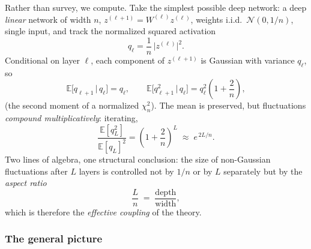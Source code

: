 \documentclass[11pt]{article}
\newcommand{\E}{\mathbb{E}}
\begin{document}
Rather than survey, we compute. Take the simplest possible deep network: a
deep \emph{linear} network of width $n$, $z^{(\ell+1)} = W^{(\ell)}
z^{(\ell)}$, weights i.i.d.\ $\mathcal{N}(0, 1/n)$, single input, and track
the normalized squared activation
\begin{equation}
  q_\ell = \frac{1}{n}\,\bigl|z^{(\ell)}\bigr|^2 .
\end{equation}
Conditional on layer $\ell$, each component of $z^{(\ell+1)}$ is Gaussian
with variance $q_\ell$, so
\begin{equation}
  \E\bigl[q_{\ell+1} \,\big|\, q_\ell\bigr] = q_\ell,
  \qquad
  \E\bigl[q_{\ell+1}^2 \,\big|\, q_\ell\bigr]
  = q_\ell^2\left(1 + \frac{2}{n}\right),
\end{equation}
(the second moment of a normalized $\chi^2_n$). The mean is preserved, but
fluctuations \emph{compound multiplicatively}: iterating,
\begin{equation}
  \label{eq:qfluct}
  \frac{\E[q_L^2]}{\E[q_L]^2} = \left(1 + \frac{2}{n}\right)^{L}
  \;\approx\; e^{\,2L/n}.
\end{equation}
Two lines of algebra, one structural conclusion: the size of
non-Gaussian fluctuations after $L$ layers is controlled not by $1/n$ or by
$L$ separately but by the \emph{aspect ratio}
\begin{equation}
  \frac{L}{n} \;=\; \frac{\text{depth}}{\text{width}} ,
\end{equation}
which is therefore the \emph{effective coupling} of the theory.

\subsubsection{The general picture}
\end{document}
